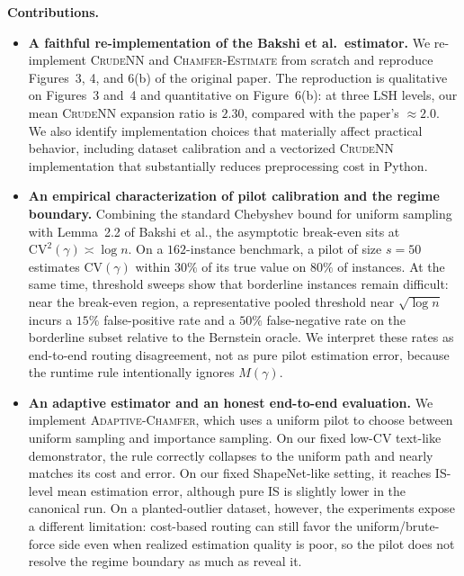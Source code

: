 \documentclass[conference]{IEEEtran}
\begin{document}
\textbf{Contributions.}
\begin{itemize}
    \item \textbf{A faithful re-implementation of the Bakshi et al.\
    estimator.} We re-implement \textsc{CrudeNN} and
    \textsc{Chamfer-Estimate} from scratch and reproduce
    Figures~3, 4, and 6(b) of the original paper. The reproduction is
    qualitative on Figures~3 and~4 and quantitative on Figure~6(b):
    at three LSH levels, our mean \textsc{CrudeNN} expansion ratio is
    $2.30$, compared with the paper's $\approx 2.0$. We also identify
    implementation choices that materially affect practical behavior,
    including dataset calibration and a vectorized \textsc{CrudeNN}
    implementation that substantially reduces preprocessing cost in
    Python.

    \item \textbf{An empirical characterization of pilot calibration
    and the regime boundary.} Combining the standard Chebyshev bound
    for uniform sampling with Lemma~2.2 of Bakshi et al., the
    asymptotic break-even sits at
    $\mathrm{CV}^2(\gamma) \asymp \log n$. On a $162$-instance
    benchmark, a pilot of size $s=50$ estimates
    $\mathrm{CV}(\gamma)$ within $30\%$ of its true value on
    $80\%$ of instances. At the same time, threshold sweeps show that
    borderline instances remain difficult: near the break-even region,
    a representative pooled threshold near $\sqrt{\log n}$ incurs a
    $15\%$ false-positive rate and a $50\%$ false-negative rate on the
    borderline subset relative to the Bernstein oracle. We interpret
    these rates as end-to-end routing disagreement, not as pure pilot
    estimation error, because the runtime rule intentionally ignores
    $M(\gamma)$.

    \item \textbf{An adaptive estimator and an honest end-to-end
    evaluation.} We implement \textsc{Adaptive-Chamfer}, which uses a
    uniform pilot to choose between uniform sampling and importance
    sampling. On our fixed low-CV text-like demonstrator, the rule
    correctly collapses to the uniform path and nearly matches its cost
    and error. On our fixed ShapeNet-like setting, it reaches IS-level
    mean estimation error, although pure IS is slightly lower in the
    canonical run. On a planted-outlier dataset, however, the
    experiments expose a different limitation: cost-based routing can
    still favor the uniform/brute-force side even when realized
    estimation quality is poor, so the pilot does not resolve the
    regime boundary as much as reveal it.
\end{itemize}
\end{document}
